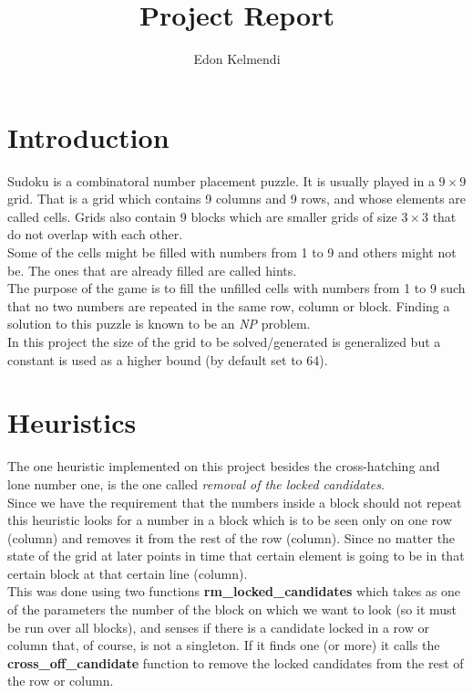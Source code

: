 \documentclass[english,a4paper]{article}
\begin{document}
\title{Project Report}
\author{Edon Kelmendi}
\maketitle
\newpage
\section{Introduction}

Sudoku is a combinatoral number placement puzzle. It is usually played
in a $9\times 9$ grid. That is a grid which contains 9 columns and 9 rows,
and whose elements are called cells. Grids also contain 9 blocks which
are smaller grids of size $3\times 3$ that do not overlap with each other.\\

Some of the cells might be filled with numbers from 1 to 9 and others
might not be. The ones that are already filled are called hints.\\

The purpose of the game is to fill the unfilled cells with numbers
from 1 to 9 such that no two numbers are repeated in the same row,
column or block. Finding a solution to this puzzle is known to be an
\emph{NP} problem.\\ 

In this project the size of the grid to be solved/generated is
generalized but a constant is used as a higher bound (by default set
to 64).\\

\section{Heuristics}

The one heuristic implemented on this project besides the
cross-hatching and lone number one, is the one called \emph{removal of
  the locked candidates}.\\

Since we have the requirement that the numbers inside a block should
not repeat this heuristic looks for a number in a block which is to be
seen only on one row (column) and removes it from the rest of the row
(column). Since no matter the state of the grid at later points in
time that certain element is going to be in that certain block at that
certain line (column).\\

This was done using two functions \textbf{rm\_locked\_candidates} which
takes as one of the parameters the number of the block on which we
want to look (so it must be run over all blocks), and senses if there
is a candidate locked in a row or column that, of course, is not a
singleton. If it finds one (or more) it calls the
\textbf{cross\_off\_candidate} function to remove the locked candidates
from the rest of the row or column.\\
\end{document}

